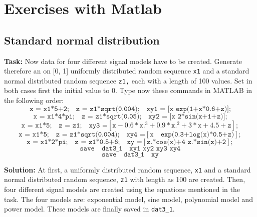
\chapter{Exercises with Matlab}


\section{ Standard normal distribution } \label{ Standard normal distribution } 
\noindent \textbf{Task:} Now data for four different signal models have to be created. Generate therefore an on [0, 1] uniformly distributed random sequence \texttt{x1} and a standard normal distributed random sequence \texttt{z1,} each with a length of 100 values. Set in both cases first the initial value to 0. Type now these commands in MATLAB in the following order: \\

    $$    \texttt{x = x1*5+2;} \quad   \texttt{z = z1*sqrt(0.004);} \quad   \texttt{xy1 = [x exp(1+x*0.6+z)];} $$     
    $$     \texttt{x = x1*4*pi;} \quad  \texttt{z = z1*sqrt(0.05);} \quad  \texttt{xy2 = [x 2*sin(x+1+z)];} $$
    $$    \texttt{x = x1*5;} \quad   \texttt{z = z1;} \quad   \texttt{xy3 =} [\texttt{x} -0.6*\texttt{x}.^3+0.9*\texttt{x}.^2+3*\texttt{x}+4.5+\texttt{z}]; $$
    $$     \texttt{x = x1*5;} \quad   \texttt{z = z1*sqrt(0.004);} \quad \texttt{xy4 =} [\texttt{x} \quad \texttt{exp(0.3+log(x)*0.5+z)}];  $$
    $$   \texttt{x = x1*2*pi;} \quad  \texttt{z = z1*0.5+6;} \quad   \texttt{xy =} [\texttt{z.*cos(x)+4 z.*sin(x)+2}]; $$
    $$   \texttt{save} \quad \texttt{dat3\_1} \quad \texttt{xy1 xy2 xy3 xy4}$$
    $$ \texttt{save} \quad \texttt{dat3\_1} \quad \texttt{xy} $$

\noindent \textbf{Solution:}
\noindent At first, a uniformly distributed random sequence, \texttt{x1} and a standard normal distributed random sequence, \texttt{z1} with length as 100 are created. Then, four different signal models are created using the equations mentioned in the task. The four models are: exponential model, sine model, polynomial model and power model. These models are finally saved in \texttt{dat3\_1}.

